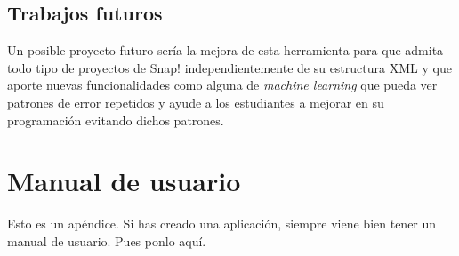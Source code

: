 \documentclass[a4paper, 12pt]{book}
\begin{document}
\section{Trabajos futuros}
\label{sec:trabajos_futuros}

Un posible proyecto futuro sería la mejora de esta herramienta para que admita todo tipo de proyectos de Snap! independientemente de su estructura XML y que aporte nuevas funcionalidades como alguna de \textit{machine learning} que pueda ver patrones de error repetidos y ayude a los estudiantes a mejorar en su programación evitando dichos patrones.


\cleardoublepage
\appendix
\chapter{Manual de usuario}
\label{app:manual}

Esto es un apéndice.
Si has creado una aplicación, siempre viene bien tener un manual de usuario.
Pues ponlo aquí.


\cleardoublepage


\end{document}
